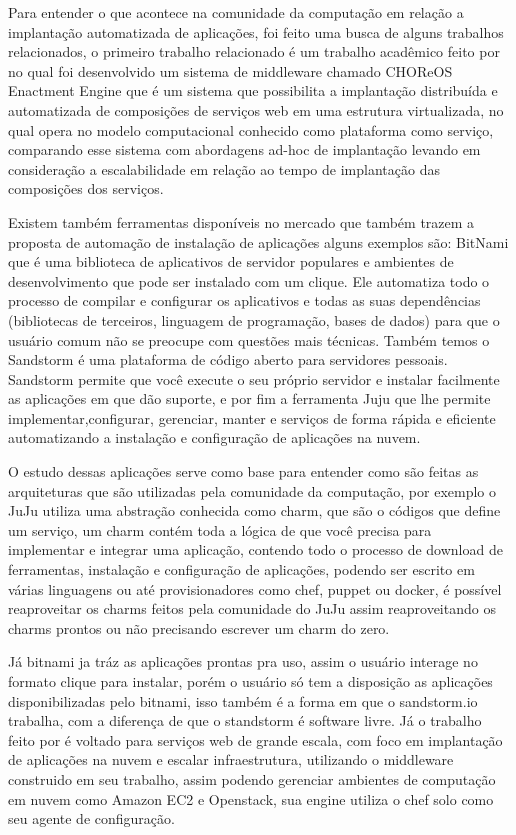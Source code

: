 Para entender o que acontece na comunidade da computação em relação a implantação
automatizada de aplicações, foi feito uma busca de alguns trabalhos relacionados, o primeiro
trabalho relacionado é um trabalho acadêmico feito por\cite{leo2014} no qual foi
desenvolvido um sistema de middleware chamado CHOReOS Enactment Engine que é um
sistema que possibilita a implantação distribuída e automatizada de composições
de serviços web em uma estrutura virtualizada, no qual opera no modelo
computacional conhecido como plataforma como serviço, comparando esse sistema
com abordagens ad-hoc de implantação levando em consideração a escalabilidade
em relação ao tempo de implantação das composições dos serviços.

Existem também ferramentas disponíveis no mercado que também trazem a proposta
de automação de instalação de aplicações alguns exemplos são:\cite{bitnami}
BitNami que é uma biblioteca de aplicativos de servidor populares e ambientes de
desenvolvimento que pode ser instalado com um clique. Ele automatiza todo o
processo de compilar e configurar os aplicativos e todas as suas dependências
(bibliotecas de terceiros, linguagem de programação, bases de dados) para que o
usuário comum não se preocupe com questões mais técnicas. Também temos o\cite{sandstormio} Sandstorm é uma plataforma de código aberto para servidores
pessoais. Sandstorm permite que você execute o seu próprio servidor e instalar
facilmente as aplicações em que dão suporte, e por fim a ferramenta\cite{juju}
Juju que lhe permite implementar,configurar, gerenciar, manter e serviços de forma
rápida e eficiente automatizando a instalação e configuração de aplicações na nuvem.

O estudo dessas aplicações serve como base para entender como são feitas as
arquiteturas que são utilizadas pela comunidade da computação, por exemplo o JuJu
utiliza uma abstração conhecida como charm, que são o códigos que define um serviço,
um charm contém toda a lógica de que você precisa para implementar e integrar uma
aplicação, contendo todo o processo de download de ferramentas, instalação e configuração
de aplicações, podendo ser escrito
em várias linguagens ou até provisionadores como chef, puppet ou docker\cite{juju}, é
possível reaproveitar os charms feitos pela comunidade do JuJu assim reaproveitando
os charms prontos ou não precisando escrever um charm do zero.

Já bitnami ja tráz as aplicações
prontas pra uso, assim o usuário interage no formato clique para instalar, porém o usuário
só tem a disposição as aplicações disponibilizadas pelo bitnami, isso também é
a forma em que o sandstorm.io trabalha, com a diferença de que o standstorm é
software livre. Já o trabalho feito por\cite{leo2014} é voltado para serviços web
de grande escala, com foco em implantação de aplicações na nuvem e escalar infraestrutura, utilizando o middleware
construido em seu trabalho, assim podendo gerenciar ambientes de computação em nuvem
como Amazon EC2 e Openstack, sua engine utiliza o chef solo como seu agente de configuração.

